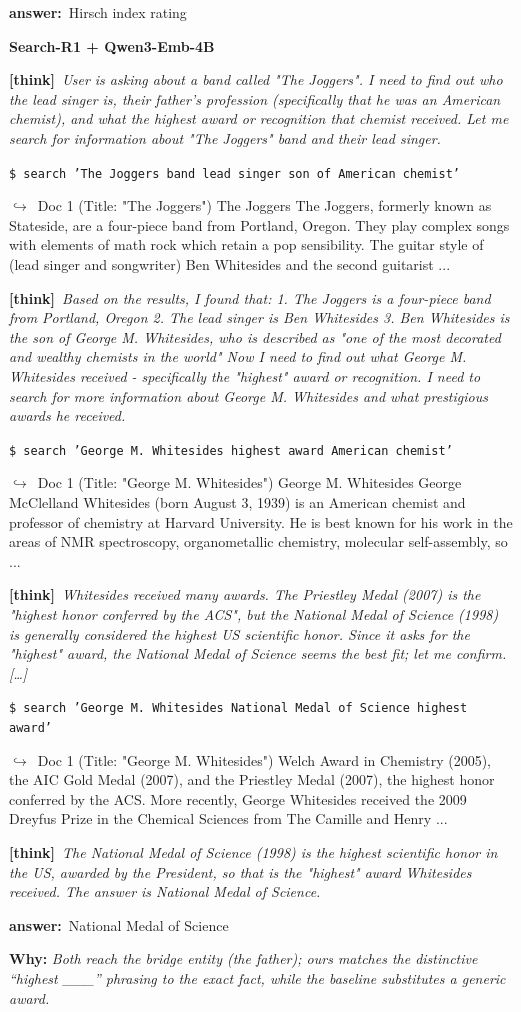 \documentclass{article} %
\newcommand{\xmark}{\textcolor{red!60!black}{\ding{55}}}
\newcommand{\winbadge}{\colorbox{green!50!black}{\textcolor{white}{\scriptsize\bfseries\,WIN\,}}}
\newcommand{\thk}[1]{{\footnotesize\textcolor{violet!75!black}{\textbf{[think]}}\ \textit{#1}\par}}
\newcommand{\cmd}[1]{{\footnotesize\texttt{\textcolor{blue!35!black}{\$\ #1}}\par}}
\newcommand{\retr}[1]{{\footnotesize\textcolor{black!65}{\quad$\hookrightarrow$\ #1}\par}}
\newcommand{\ans}[1]{{\footnotesize\textbf{answer:}\ #1\par}}
\begin{document}
\begin{cmpbox}[label={ex:hotpot-joggers},title={\winbadge\ \ \textsc{HotpotQA -- multi-hop bridge + distinctive phrase}}]
  \ans{Hirsch index rating}
\smallskip\par\textbf{Search-R1 + Qwen3-Emb-4B}~\xmark\par
  \thk{User is asking about a band called "The Joggers". I need to find out who the lead singer is, their father's profession (specifically that he was an American chemist), and what the highest award or recognition that chemist received. Let me search for information about "The Joggers" band and their lead singer.}
  \cmd{search 'The Joggers band lead singer son of American chemist'}
  \retr{Doc 1 (Title: "The Joggers") The Joggers The Joggers, formerly known as Stateside, are a four-piece band from Portland, Oregon. They play complex songs with elements of math rock which retain a pop sensibility. The guitar style of (lead singer and songwriter) Ben Whitesides and the second guitarist ...}
  \thk{Based on the results, I found that: 1. The Joggers is a four-piece band from Portland, Oregon 2. The lead singer is Ben Whitesides 3. Ben Whitesides is the son of George M. Whitesides, who is described as "one of the most decorated and wealthy chemists in the world" Now I need to find out what George M. Whitesides received - specifically the "highest" award or recognition. I need to search for more information about George M. Whitesides and what prestigious awards he received.}
  \cmd{search 'George M. Whitesides highest award American chemist'}
  \retr{Doc 1 (Title: "George M. Whitesides") George M. Whitesides George McClelland Whitesides (born August 3, 1939) is an American chemist and professor of chemistry at Harvard University. He is best known for his work in the areas of NMR spectroscopy, organometallic chemistry, molecular self-assembly, so ...}
  \thk{Whitesides received many awards. The Priestley Medal (2007) is the "highest honor conferred by the ACS", but the National Medal of Science (1998) is generally considered the highest US scientific honor. Since it asks for the "highest" award, the National Medal of Science seems the best fit; let me confirm. […]}
  \cmd{search 'George M. Whitesides National Medal of Science highest award'}
  \retr{Doc 1 (Title: "George M. Whitesides") Welch Award in Chemistry (2005), the AIC Gold Medal (2007), and the Priestley Medal (2007), the highest honor conferred by the ACS. More recently, George Whitesides received the 2009 Dreyfus Prize in the Chemical Sciences from The Camille and Henry ...}
  \thk{The National Medal of Science (1998) is the highest scientific honor in the US, awarded by the President, so that is the "highest" award Whitesides received. The answer is National Medal of Science.}
  \ans{National Medal of Science}
\smallskip\par\textbf{Why:} \textit{Both reach the bridge entity (the father); ours matches the distinctive ``highest \_\_\_'' phrasing to the exact fact, while the baseline substitutes a generic award.}
\end{cmpbox}\bigskip
\end{document}
